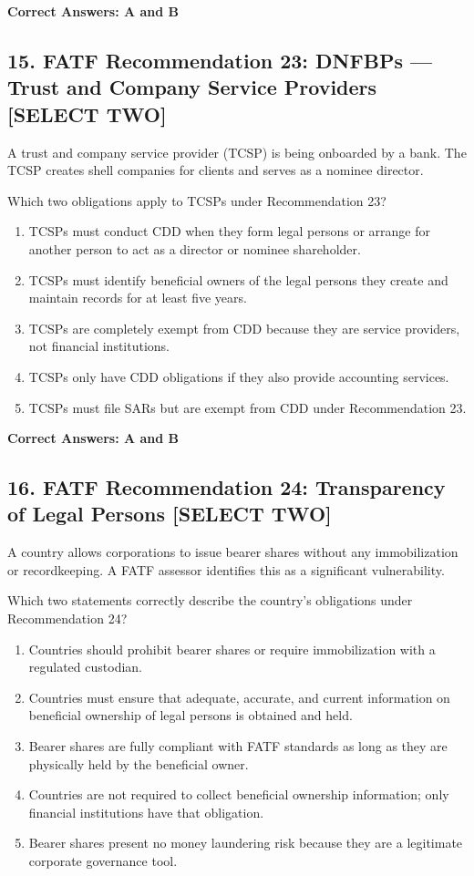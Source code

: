 \documentclass[11pt,a4paper]{article}
\begin{document}
	\textbf{Correct Answers: A and B}
	
	\subsection{15. FATF Recommendation 23: DNFBPs — Trust and Company Service Providers \textnormal{[SELECT TWO]}}
	
	A trust and company service provider (TCSP) is being onboarded by a bank. The TCSP creates shell companies for clients and serves as a nominee director.
	
	Which two obligations apply to TCSPs under Recommendation 23?
	
	\begin{enumerate}[label=\Alph*.]
		\item TCSPs must conduct CDD when they form legal persons or arrange for another person to act as a director or nominee shareholder.
		\item TCSPs must identify beneficial owners of the legal persons they create and maintain records for at least five years.
		\item TCSPs are completely exempt from CDD because they are service providers, not financial institutions.
		\item TCSPs only have CDD obligations if they also provide accounting services.
		\item TCSPs must file SARs but are exempt from CDD under Recommendation 23.
	\end{enumerate}
	
	\textbf{Correct Answers: A and B}
	
	\subsection{16. FATF Recommendation 24: Transparency of Legal Persons \textnormal{[SELECT TWO]}}
	
	A country allows corporations to issue bearer shares without any immobilization or recordkeeping. A FATF assessor identifies this as a significant vulnerability.
	
	Which two statements correctly describe the country's obligations under Recommendation 24?
	
	\begin{enumerate}[label=\Alph*.]
		\item Countries should prohibit bearer shares or require immobilization with a regulated custodian.
		\item Countries must ensure that adequate, accurate, and current information on beneficial ownership of legal persons is obtained and held.
		\item Bearer shares are fully compliant with FATF standards as long as they are physically held by the beneficial owner.
		\item Countries are not required to collect beneficial ownership information; only financial institutions have that obligation.
		\item Bearer shares present no money laundering risk because they are a legitimate corporate governance tool.
	\end{enumerate}
	
\end{document}
